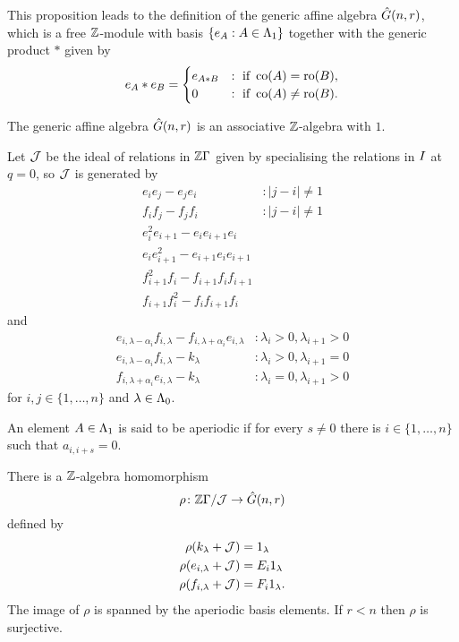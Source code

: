 \documentclass[a4paper, 11pt]{report}
\begin{document}
This proposition leads to the definition of the generic affine algebra $\hat{G}(n,r)$, which is a free $\mathbb{Z}$-module with basis $\{e_A:A\in\Lambda_1{}\}$ together with the generic product $\ast$ given by
\begin{equation*}
e_A\ast e_B = \begin{cases}
e_{A\ast B} &: \text{ if } \operatorname{co}(A)=\operatorname{ro}(B),\\
0 &: \text{ if } \operatorname{co}(A)\neq\operatorname{ro}(B).
\end{cases}
\end{equation*}

\begin{theorem*}
The generic affine algebra $\hat{G}(n,r)$ is an associative $\mathbb{Z}$-algebra with $1$.
\end{theorem*}

Let $\mathcal{J}$ be the ideal of relations in $\mathbb{Z}\Gamma$ given by specialising the relations in $I$ at $q=0$, so $\mathcal{J}$ is generated by
\begin{align*}
e_ie_j - e_je_i &: |j-i|\neq 1\\
f_if_j - f_jf_i &: |j-i|\neq 1\\
e_i^2e_{i+1} - e_ie_{i+1}e_i &\\
e_ie_{i+1}^2 - e_{i+1}e_ie_{i+1} &\\
f_{i+1}^2f_i - f_{i+1}f_if_{i+1} &\\
f_{i+1}f_i^2 - f_if_{i+1}f_i &
\end{align*}
and
\begin{align*}
e_{i,\lambda-\alpha_i}f_{i,\lambda} - f_{i,\lambda+\alpha_i}e_{i,\lambda} &: \lambda_i>0, \lambda_{i+1}>0\\
e_{i,\lambda-\alpha_i}f_{i,\lambda} - k_\lambda &: \lambda_i>0, \lambda_{i+1}=0\\
f_{i,\lambda+\alpha_i}e_{i,\lambda} - k_\lambda &: \lambda_i=0, \lambda_{i+1}>0
\end{align*}
for $i,j\in\{1,\ldots,n\}$ and $\lambda\in\Lambda_0{}$.

An element $A\in\Lambda_1{}$ is said to be aperiodic if for every $s\neq 0$ there is $i\in\{1,\ldots,n\}$ such that $a_{i,i+s}=0$.

\begin{proposition*}
There is a $\mathbb{Z}$-algebra homomorphism
\begin{equation*}
\rho\colon\mathbb{Z}\Gamma/{\mathcal{J}}\to\hat{G}(n,r)
\end{equation*}
defined by
\begin{align*}
\rho(k_\lambda + \mathcal{J}) &= 1_\lambda\\
\rho(e_{i,\lambda} + \mathcal{J}) &= E_i1_\lambda\\
\rho(f_{i,\lambda} + \mathcal{J}) &= F_i1_\lambda.
\end{align*}
The image of $\rho$ is spanned by the aperiodic basis elements. If $r<n$ then $\rho$ is surjective.
\end{proposition*}
\end{document}
